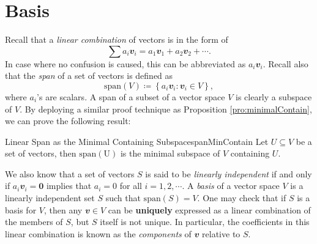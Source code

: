 \documentclass[math]{amznotes}
\theoremstyle{remark}
\newcommand{\zero}{\mathbf{0}}
\begin{document}
\section{Basis}
Recall that a \textit{linear combination} of vectors is in the form of
\begin{equation*}
    \sum a_i\mathbfit{v}_i = a_1\mathbfit{v}_1 + a_2\mathbfit{v}_2 + \cdots.
\end{equation*}
In case where no confusion is caused, this can be abbreviated as $a_i\mathbfit{v}_i$. Recall also that the \textit{span} of a set of vectors is defined as
\begin{equation*}
    \mathrm{span}(V) \coloneqq \left\{a_i\mathbfit{v}_i \colon \mathbfit{v}_i \in V\right\},
\end{equation*}
where $a_i$'s are scalars. A span of a subset of a vector space $V$ is clearly a subspace of $V$. By deploying a similar proof technique as Proposition \ref{pro:minimalContain}, we can prove the following result:
\begin{probox}{Linear Span as the Minimal Containing Subspace}{spanMinContain}
    Let $U \subseteq V$ be a set of vectors, then $\mathrm{span(U)}$ is the minimal subspace of $V$ containing $U$.
\end{probox}
We also know that a set of vectors $S$ is said to be \textit{linearly independent} if and only if  $a_i\mathbfit{v}_i = \zero$ implies that $a_i = 0$ for all $i = 1, 2, \cdots$. A \textit{basis} of a vector space $V$ is a linearly independent set $S$ such that $\mathrm{span}(S) = V$. One may check that if $S$ is a basis for $V$, then any $\mathbfit{v} \in V$ can be \textbf{uniquely} expressed as a linear combination of the members of $S$, but $S$ itself is not unique. In particular, the coefficients in this linear combination is known as the \textit{components} of $\mathbfit{v}$ relative to $S$.
\end{document}
